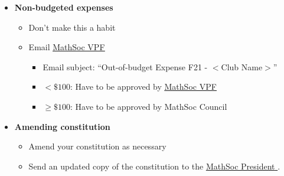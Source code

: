 \documentclass[utf8]{article}
\makeatletter
\newcommand{\termandyear}{F21 }
\newcommand{\MathSocVPF}{\href{mailto:vpf@mathsoc.uwaterloo.ca}{\underline{MathSoc VPF} }}
\newcommand{\MathSocPrez}{\href{mailto:prez@mathsoc.uwaterloo.ca}{\underline{MathSoc President} }}
\newcommand{\pop}{\hyperref[sec:pop]{\underline{Proof of Payment}}}
\makeatother
\begin{document}
\begin{itemize}
\begin{itemize}
\begin{itemize}
            \begin{itemize}
                \item Screenshot the receipts
                \item $\geq \$100$: SAVE the receipt until reimbursed!!
            \end{itemize}
            \item \textit{In-person events}
            \begin{itemize}
                \item Get physical receipts (print if necessary)
            \end{itemize}
        \end{itemize}
        \item[3)] Get your \pop (unless you paid cash)
        \item Submit 1), 2), and 3) 
        \begin{itemize}
            \item \textit{Online events}
            \begin{itemize}
                \item[$\square$] Send to \MathSocVPF; email subject: ``Cheque Request \termandyear - $<$Club Name$>$''
            \end{itemize}
            \item \textit{In-person events}
            \begin{itemize}
                \item[$\square$] Hand in to MathSoc office (MC 3038)
            \end{itemize}
        \end{itemize}
    \end{itemize}
    
\par\rule{\textwidth}{0.4pt}

\newpage
    \item \textbf{Non-budgeted expenses}
    \begin{itemize}
        \item Don't make this a habit
        \item Email \MathSocVPF
        \begin{itemize}
            \item[\textperiodcentered] Email subject: ``Out-of-budget Expense \termandyear - $<$Club Name$>$''
            \item[\textperiodcentered] $<\$100$: Have to be approved by \MathSocVPF
            \item[\textperiodcentered] $\geq \$100$: Have to be approved by MathSoc Council
        \end{itemize}
    \end{itemize}
    \item[\textbullet] \textbf{Amending constitution}
    \begin{itemize}
        \item Amend your constitution as necessary
        \item Send an updated copy of the constitution to the \MathSocPrez.
    \end{itemize}
\end{itemize}
\end{document}
